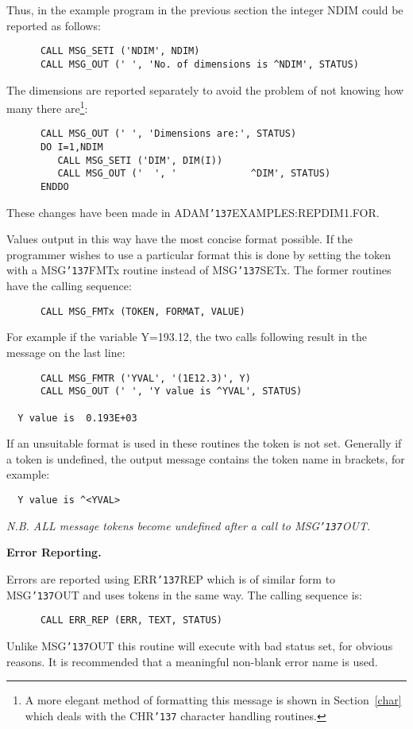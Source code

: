 \documentclass[twoside,11pt]{article}
\renewcommand{\_}{{\tt\char'137}}
\begin{document}
Thus, in the example program in the previous section the integer NDIM could
be reported as follows:
\begin{verbatim}                                                              
      CALL MSG_SETI ('NDIM', NDIM)
      CALL MSG_OUT (' ', 'No. of dimensions is ^NDIM', STATUS) 
\end{verbatim}
The dimensions are reported separately to avoid the problem
of not knowing how many there are\footnote{A more elegant method of
formatting this message is shown in Section~\ref{char} which deals with 
the CHR\_ character handling routines.}:
\begin{verbatim}
      CALL MSG_OUT (' ', 'Dimensions are:', STATUS) 
      DO I=1,NDIM
         CALL MSG_SETI ('DIM', DIM(I))
         CALL MSG_OUT ('  ', '             ^DIM', STATUS) 
      ENDDO
\end{verbatim}
These changes have been made in ADAM\_EXAMPLES:REPDIM1.FOR.

Values output in this way have the most concise format possible.
If the programmer wishes to use a particular format this is done
by setting the token with a MSG\_FMTx routine instead
of MSG\_SETx.
The former routines have the calling sequence:
\begin{verbatim}
      CALL MSG_FMTx (TOKEN, FORMAT, VALUE)
\end{verbatim}
For example if the variable Y=193.12, the two calls following result in the
message on the last line:
\begin{verbatim}
      CALL MSG_FMTR ('YVAL', '(1E12.3)', Y)
      CALL MSG_OUT (' ', 'Y value is ^YVAL', STATUS) 

  Y value is  0.193E+03
\end{verbatim}
If an unsuitable format is used in these  routines the token is not set.
Generally if a token is undefined, the output message contains the token name
in brackets, for example:
\begin{verbatim}
  Y value is ^<YVAL>
\end{verbatim}
{\sl N.B. ALL message tokens become undefined after a call to MSG\_OUT.}

{\bigskip\large\bf Error Reporting.}

Errors are reported using ERR\_REP which is of similar form to 
MSG\_OUT and uses tokens in the same way. The calling sequence is:
\begin{verbatim}
      CALL ERR_REP (ERR, TEXT, STATUS)
\end{verbatim}
Unlike MSG\_OUT this routine will execute with bad status set, for obvious 
reasons.
It is recommended that a meaningful non-blank error name is used.
\end{document}
